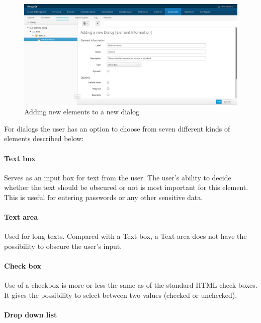 \begin{figure}
  \centering
  \def\svgwidth{\columnwidth}
  \includegraphics[width=14cm,keepaspectratio]{fig/dialog-elements}
  \caption{Adding new elements to a new dialog}\label{fig:dialog-elements}
\end{figure}

For dialogs the user has an option to choose from seven different kinds of
elements described below:

\paragraph{Text box}

Serves as an input box for text from the user. The user's ability to decide
whether the text should be obscured or not is most important for this element.
This is useful for entering passwords or any other sensitive data.

\paragraph{Text area}

Used for long texts. Compared with a Text box, a Text area does
not have the possibility to obscure the user's input.

\paragraph{Check box}

Use of a checkbox is more or less the same as of the standard HTML check boxes.
It gives the possibility to select between two values (checked or unchecked).

\paragraph{Drop down list}

